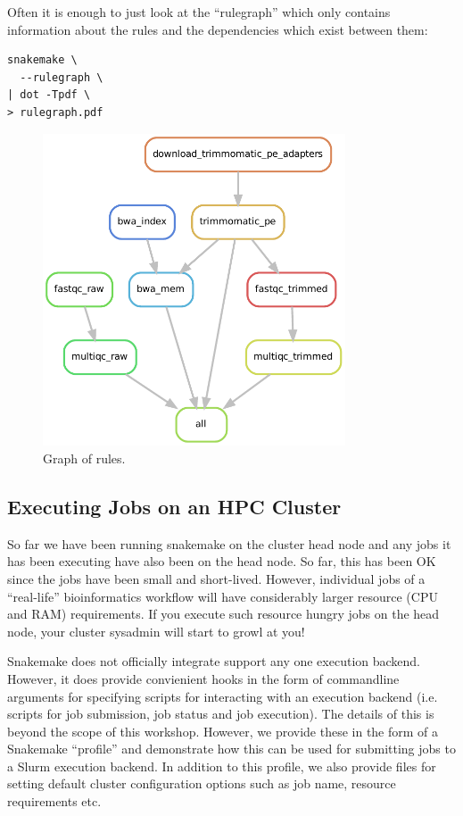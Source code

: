 Often it is enough to just look at the ``rulegraph'' which only contains information about the rules and the dependencies which exist between them:

\begin{lstlisting}
snakemake \
  --rulegraph \
| dot -Tpdf \
> rulegraph.pdf
\end{lstlisting}

\begin{figure}[H]
\centering
\includegraphics[width=0.8\textwidth]{handout/rulegraph.pdf}
\caption{Graph of rules.}
\label{fig:rulegraph}
\end{figure}

\subsection{Executing Jobs on an HPC Cluster}

So far we have been running snakemake on the cluster head node and any jobs it has been executing have also been on the head node. So far, this has been OK
since the jobs have been small and short-lived. However, individual jobs of a ``real-life'' bioinformatics workflow will have considerably larger resource
(CPU and RAM) requirements. If you execute such resource hungry jobs on the head node, your cluster sysadmin will start to growl at you!

Snakemake does not officially integrate support any one execution backend. However, it does provide convienient hooks in the form of commandline arguments for specifying
scripts for interacting with an execution backend (i.e. scripts for job submission, job status and job execution). The details of this is beyond the scope of this
workshop. However, we provide these in the form of a Snakemake ``profile'' and demonstrate how this can be used for submitting jobs to a Slurm execution backend.
In addition to this profile, we also provide files for setting default cluster configuration options such as job name, resource requirements etc.

